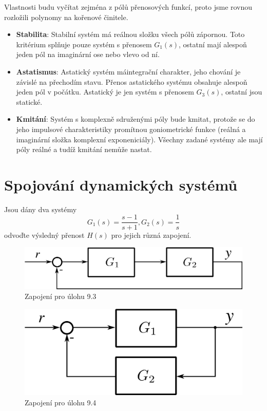 \documentclass[twoside]{article}
\begin{document}
Vlastnosti budu vyčítat zejména z pólů přenosových funkcí, proto jsme rovnou rozložili polynomy na kořenové činitele.

\begin{itemize}
	\item \textbf{Stabilita}: Stabilní systém má reálnou složku všech pólů zápornou. Toto kritérium splňuje pouze systém s přenosem $G_1(s)$,
	ostatní mají alespoň jeden pól na imaginární ose nebo vlevo od ní.
	\item \textbf{Astatismus}: Astatický systém máintegrační charakter, jeho chování je závislé na přechodím stavu. Přenos astatického 
	systému obsahuje alespoň jeden pól v počátku. Astatický je jen systém s přenosem $G_3(s)$, ostatní jsou statické.
	\item \textbf{Kmitání}: Systém s komplexně sdruženými póly bude kmitat, protože se do jeho impulsové charakteristiky promítnou goniometrické funkce
	(reálná a imaginární složka komplexní exponeniciály). Všechny zadané systémy ale mají póly reálné a tudíž kmitání nemůže nastat.
\end{itemize}






















\section{Spojování dynamických systémů}
\label{sec:ukol9}
Jsou dány dva systémy
\begin{equation*}
	G_1(s) = \frac{s-1}{s+1}, G_2(s) = \frac{1}{s}
\end{equation*}
odvoďte výsledný přenost $H(s)$ pro jejich různá zapojení.
\begin{figure}[htbp]
	\centering
	\includegraphics[width=.4\textwidth]{zadani9-3.png}
	\caption{Zapojení pro úlohu 9.3}
	\label{fig:zadani9-3}
\end{figure}
\begin{figure}[htbp]
	\centering
	\includegraphics[width=.4\textwidth]{zadani9-4.png}
	\caption{Zapojení pro úlohu 9.4}
	\label{fig:zadani9-4}
\end{figure}
\end{document}
